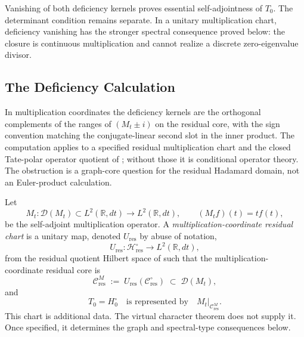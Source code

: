 \begin{remark}
\label{v4-arith:w9-r4:rem:smartest-next-calculation}
Vanishing of both deficiency kernels proves essential
self-adjointness of \(T_0\). The determinant condition remains
separate. In a unitary multiplication chart, deficiency vanishing
has the stronger spectral consequence proved below: the closure
is continuous multiplication and cannot realize a discrete
zero-eigenvalue divisor.
\end{remark}

\subsection{The Deficiency Calculation}
\label{v4-arith:w9-r4:pdnf:deficiency-calculation}

In multiplication coordinates the deficiency kernels are the orthogonal
complements of the ranges of \((M_t \pm i)\) on the residual core,
with the sign convention matching the conjugate-linear second slot in
the inner product. The computation applies to a specified residual
multiplication chart and the closed Tate-polar operator quotient of
; without those
it is conditional operator theory. The obstruction is a graph-core
question for the residual Hadamard domain, not an Euler-product
calculation.

\begin{definition}
\label{v4-arith:w9-r4:def:meyer-coordinate-core}
\ClaimStatusDefinitional Let
\[
M_{t}\colon \mathcal{D}(M_{t})\subset L^{2}(\mathbb{R},dt)\to
L^{2}(\mathbb{R},dt),\qquad (M_{t}f)(t)=t f(t),
\]
be the self-adjoint multiplication operator. A \emph{multiplication-coordinate
residual chart} is a unitary map, denoted \(U_{\mathrm{res}}\) by
abuse of notation,
\[
U_{\mathrm{res}}\colon\mathcal{H}_{\mathrm{res}}^{\circ}
\longrightarrow L^{2}(\mathbb{R},dt),
\]
from the residual quotient Hilbert space of
 such that the
multiplication-coordinate residual core is
\begin{equation}
\label{v4-arith:w9-r4:eq:meyer-coordinate-core}
\mathcal{C}_{\mathrm{res}}^{M}
\;:=\;
U_{\mathrm{res}}(\mathcal{C}_{\mathrm{res}}^{\circ})
\;\subset\;
\mathcal{D}(M_{t}),
\end{equation}
and
\[
T_{0}=H_{0}^{\circ}
\quad\text{is represented by}\quad
M_{t}|_{\mathcal{C}_{\mathrm{res}}^{M}} .
\]
This chart is additional data. The virtual character theorem
 does not supply it.
Once specified, it determines the graph and spectral-type
consequences below.
\end{definition}

